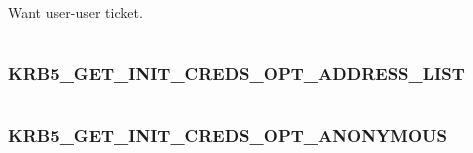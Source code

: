 \documentclass[letterpaper,10pt,english]{sphinxmanual}
\begin{document}
\begin{fulllineitems}
\label{appdev/refs/macros/KRB5_GC_USER_USER:KRB5_GC_USER_USER}
\end{fulllineitems}


Want user-user ticket.

\begin{tabulary}{\linewidth}{|L|L|}
\hline

 & 
\\
\hline\end{tabulary}



\subsubsection{KRB5\_GET\_INIT\_CREDS\_OPT\_ADDRESS\_LIST}
\label{appdev/refs/macros/KRB5_GET_INIT_CREDS_OPT_ADDRESS_LIST:krb5-get-init-creds-opt-address-list}\label{appdev/refs/macros/KRB5_GET_INIT_CREDS_OPT_ADDRESS_LIST::doc}\label{appdev/refs/macros/KRB5_GET_INIT_CREDS_OPT_ADDRESS_LIST:krb5-get-init-creds-opt-address-list-data}

\begin{fulllineitems}
\label{appdev/refs/macros/KRB5_GET_INIT_CREDS_OPT_ADDRESS_LIST:KRB5_GET_INIT_CREDS_OPT_ADDRESS_LIST}
\end{fulllineitems}


\begin{tabulary}{\linewidth}{|L|L|}
\hline

 & 
\\
\hline\end{tabulary}



\subsubsection{KRB5\_GET\_INIT\_CREDS\_OPT\_ANONYMOUS}
\label{appdev/refs/macros/KRB5_GET_INIT_CREDS_OPT_ANONYMOUS:krb5-get-init-creds-opt-anonymous-data}\label{appdev/refs/macros/KRB5_GET_INIT_CREDS_OPT_ANONYMOUS::doc}\label{appdev/refs/macros/KRB5_GET_INIT_CREDS_OPT_ANONYMOUS:krb5-get-init-creds-opt-anonymous}
\end{document}
